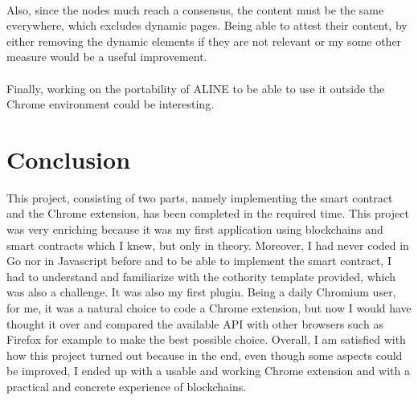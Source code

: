 \paragraph{}
Also, since the nodes much reach a consensus, the content must be the same everywhere, which excludes dynamic pages. Being able to attest their content, by either removing the dynamic elements if they are not relevant or my some other measure would be a useful improvement.

\paragraph{}
Finally, working on the portability of ALINE to be able to use it outside the Chrome environment could be interesting.

\paragraph{}

\section{Conclusion}

This project, consisting of two parts, namely implementing the smart contract and the Chrome extension, has been completed in the required time. This project was very enriching because it was my first application using blockchains and smart contracts which I knew, but only in theory. Moreover, I had never coded in Go nor in Javascript before and to be able to implement the smart contract, I had to understand and familiarize with the cothority template provided, which was also a challenge. It was also my first plugin. Being a daily Chromium user, for me, it was a natural choice to code a Chrome extension, but now I would have thought it over and compared the available API with other browsers such as Firefox for example to make the best possible choice. Overall, I am satisfied with how this project turned out because in the end, even though some aspects could be improved, I ended up with a usable and working Chrome extension and with a practical and concrete experience of blockchains.